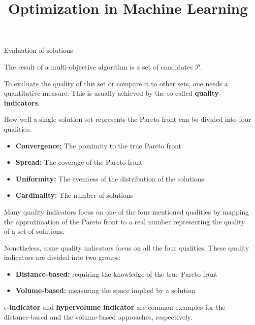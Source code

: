 \documentclass[11pt,compress,t,notes=noshow, xcolor=table]{beamer}
\title{Optimization in Machine Learning}
\date{}
\begin{document}
\sloppy



\begin{vbframe}{Evaluation of solutions}


The result of a multi-objective algorithm is a set of candidates $\mathcal{P}$.

\lz

To evaluate the quality of this set or compare it to other sets, one needs a quantitative measure. This is usually achieved by the so-called \textbf{quality indicators}.

\lz

How well a single solution set represents the Pareto front can be divided into four qualities:

\begin{itemize}
\item \textbf{Convergence:} The proximity to the true Pareto front
\item \textbf{Spread:} The coverage of the Pareto front
\item \textbf{Uniformity:} The evenness of the distribution of the solutions
\item \textbf{Cardinality:} The number of solutions
\end{itemize}

\framebreak
Many quality indicators focus on one of the four mentioned qualities by mapping the approximation of the Pareto front to a real number representing the quality of a set of solutions.
\lz

Nonetheless, some quality indicators focus on all the four qualities. These quality indicators are divided into two groups:

\begin{itemize}
\item \textbf{Distance-based:} requiring the knowledge of the true Pareto front
\item \textbf{Volume-based:} measuring the space implied by a solution
\end{itemize}

\lz

\textbf{$\epsilon$-indicator} and \textbf{hypervolume indicator} are common examples for the distance-based and the volume-based approaches, respectively.


\end{vbframe}
\end{document}
